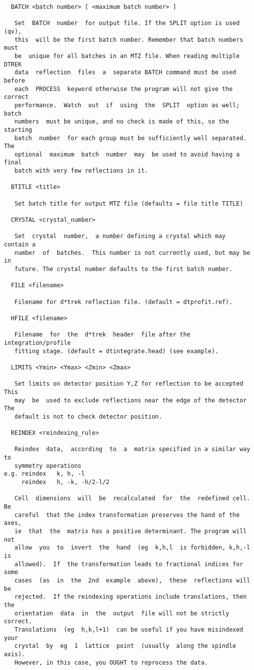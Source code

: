 \documentclass[a4paper, 11pt]{article}
\begin{document}
{\begin{verbatim}
  BATCH <batch number> [ <maximum batch number> ]

   Set  BATCH  number  for output file. If the SPLIT option is used (qv),
   this  will be the first batch number. Remember that batch numbers must
   be  unique for all batches in an MTZ file. When reading multiple DTREK
   data  reflection  files  a  separate BATCH command must be used before
   each  PROCESS  keyword otherwise the program will not give the correct
   performance.  Watch  out  if  using  the  SPLIT  option as well; batch
   numbers  must be unique, and no check is made of this, so the starting
   batch  number  for each group must be sufficiently well separated. The
   optional  maximum  batch  number  may  be used to avoid having a final
   batch with very few reflections in it.

  BTITLE <title>

   Set batch title for output MTZ file (defaults = file title TITLE)

  CRYSTAL <crystal_number>

   Set  crystal  number,  a number defining a crystal which may contain a
   number  of  batches.  This number is not currently used, but may be in
   future. The crystal number defaults to the first batch number.

  FILE <filename>

   Filename for d*trek reflection file. (default = dtprofit.ref).

  HFILE <filename>

   Filename  for  the  d*trek  header  file after the integration/profile
   fitting stage. (default = dtintegrate.head) (see example).

  LIMITS <Ymin> <Ymax> <Zmin> <Zmax>

   Set limits on detector position Y,Z for reflection to be accepted This
   may  be  used to exclude reflections near the edge of the detector The
   default is not to check detector position.

  REINDEX <reindexing_rule>

   Reindex  data,  according  to  a  matrix specified in a similar way to
   symmetry operations
e.g. reindex   k, h, -l
     reindex   h, -k, -h/2-l/2

   Cell  dimensions  will  be  recalculated  for  the  redefined cell. Be
   careful  that the index transformation preserves the hand of the axes,
   ie  that  the  matrix has a positive determinant. The program will not
   allow  you  to  invert  the  hand  (eg  k,h,l  is forbidden, k,h,-l is
   allowed).  If  the transformation leads to fractional indices for some
   cases  (as  in  the  2nd  example  above),  these  reflections will be
   rejected.  If the reindexing operations include translations, then the
   orientation  data  in  the  output  file will not be strictly correct.
   Translations  (eg  h,k,l+1)  can be useful if you have misindexed your
   crystal  by  eg  1  lattice  point  (usually  along the spindle axis).
   However, in this case, you OUGHT to reprocess the data.


\end{verbatim}}
\end{document}
